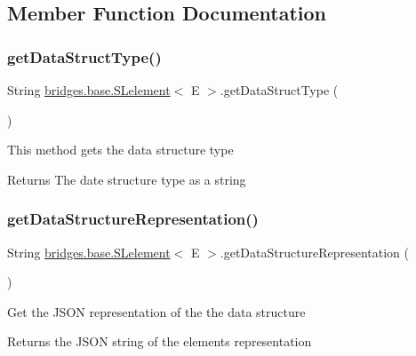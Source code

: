 \subsection{Member Function Documentation}
\mbox{\label{classbridges_1_1base_1_1_s_lelement_a8c48a2d34b238fa0ae7bf2d1ee58ea88}} 
\subsubsection{\texorpdfstring{getDataStructType()}{getDataStructType()}}
{\footnotesize\ttfamily String \mbox{\hyperlink{classbridges_1_1base_1_1_s_lelement}{bridges.\+base.\+S\+Lelement}}$<$ E $>$.get\+Data\+Struct\+Type (\begin{DoxyParamCaption}{ }\end{DoxyParamCaption})}

This method gets the data structure type

\begin{DoxyReturn}{Returns}
The date structure type as a string 
\end{DoxyReturn}
\mbox{\label{classbridges_1_1base_1_1_s_lelement_a2928f5e8640deaceeecf01adcd75669b}} 
\subsubsection{\texorpdfstring{getDataStructureRepresentation()}{getDataStructureRepresentation()}}
{\footnotesize\ttfamily String \mbox{\hyperlink{classbridges_1_1base_1_1_s_lelement}{bridges.\+base.\+S\+Lelement}}$<$ E $>$.get\+Data\+Structure\+Representation (\begin{DoxyParamCaption}{ }\end{DoxyParamCaption})}

Get the J\+S\+ON representation of the the data structure

\begin{DoxyReturn}{Returns}
the J\+S\+ON string of the element\textquotesingle{}s representation 
\end{DoxyReturn}
\mbox{\label{classbridges_1_1base_1_1_s_lelement_abadffea339171349a8e86ded9cd3fe21}} 
